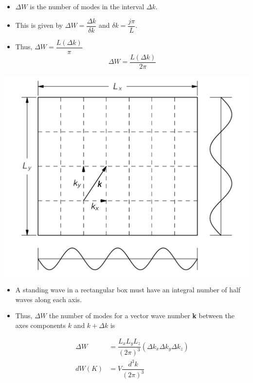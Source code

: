 \documentclass[aspectratio=169]{beamer}
\begin{document}
\begin{frame}
	\begin{itemize}
		\item $\Delta W$ is the number of modes in the interval $\Delta k$.\pause \newline
		\item This is given by $\Delta W = \dfrac{\Delta k}{\delta k}$ and $\delta k = \dfrac{j\pi}{L}$.\pause \newline
		\item Thus, $ \Delta W = \dfrac{L (\Delta k)}{\pi}$ \pause \newline 
		   \[ \boxed{\Delta W = \dfrac{L (\Delta k)}{2\pi}} \]
	\end{itemize}
\end{frame}

\begin{frame}
 \center\includegraphics[scale=0.75]{k-space.png}
\end{frame}

\begin{frame}
	\begin{itemize}
		\item A standing wave in a rectangular box must have an integral number of half waves along each axis.
		\item Thus, $\Delta W$ the number of modes for a vector wave number \textbf{k} between the axes components $k$ and $k+\Delta k$ is \pause \newline
		
		\begin{align}
			\Delta W &= \dfrac{L_{x}L_{y}L_{z}}{(2\pi)^3}(\Delta k_{x}\Delta k_{y} \Delta k_{z}) \\[2ex]
			dW(K) &= V\dfrac{d^3k}{(2\pi)^3}
		\end{align}
		
	\end{itemize}
\end{frame}
\end{document}
